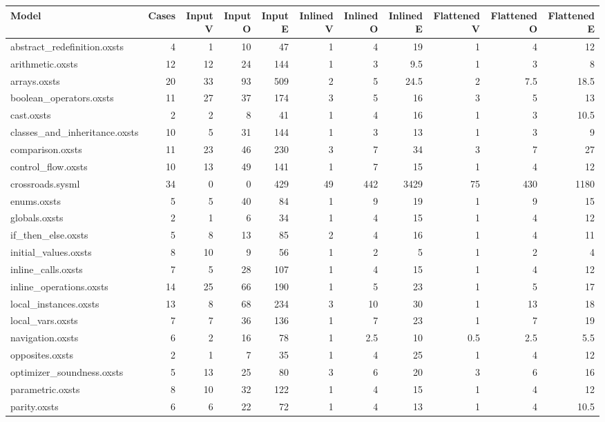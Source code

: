 \begin{tabular}{lrrrrrrrrrr}
\toprule
Model & Cases & Input V & Input O & Input E & Inlined V & Inlined O & Inlined E & Flattened V & Flattened O & Flattened E \\
\midrule
abstract\_redefinition.oxsts & 4 & 1 & 10 & 47 & 1 & 4 & 19 & 1 & 4 & 12 \\
arithmetic.oxsts & 12 & 12 & 24 & 144 & 1 & 3 & 9.5 & 1 & 3 & 8 \\
arrays.oxsts & 20 & 33 & 93 & 509 & 2 & 5 & 24.5 & 2 & 7.5 & 18.5 \\
boolean\_operators.oxsts & 11 & 27 & 37 & 174 & 3 & 5 & 16 & 3 & 5 & 13 \\
cast.oxsts & 2 & 2 & 8 & 41 & 1 & 4 & 16 & 1 & 3 & 10.5 \\
classes\_and\_inheritance.oxsts & 10 & 5 & 31 & 144 & 1 & 3 & 13 & 1 & 3 & 9 \\
comparison.oxsts & 11 & 23 & 46 & 230 & 3 & 7 & 34 & 3 & 7 & 27 \\
control\_flow.oxsts & 10 & 13 & 49 & 141 & 1 & 7 & 15 & 1 & 4 & 12 \\
crossroads.sysml & 34 & 0 & 0 & 429 & 49 & 442 & 3429 & 75 & 430 & 1180 \\
enums.oxsts & 5 & 5 & 40 & 84 & 1 & 9 & 19 & 1 & 9 & 15 \\
globals.oxsts & 2 & 1 & 6 & 34 & 1 & 4 & 15 & 1 & 4 & 12 \\
if\_then\_else.oxsts & 5 & 8 & 13 & 85 & 2 & 4 & 16 & 1 & 4 & 11 \\
initial\_values.oxsts & 8 & 10 & 9 & 56 & 1 & 2 & 5 & 1 & 2 & 4 \\
inline\_calls.oxsts & 7 & 5 & 28 & 107 & 1 & 4 & 15 & 1 & 4 & 12 \\
inline\_operations.oxsts & 14 & 25 & 66 & 190 & 1 & 5 & 23 & 1 & 5 & 17 \\
local\_instances.oxsts & 13 & 8 & 68 & 234 & 3 & 10 & 30 & 1 & 13 & 18 \\
local\_vars.oxsts & 7 & 7 & 36 & 136 & 1 & 7 & 23 & 1 & 7 & 19 \\
navigation.oxsts & 6 & 2 & 16 & 78 & 1 & 2.5 & 10 & 0.5 & 2.5 & 5.5 \\
opposites.oxsts & 2 & 1 & 7 & 35 & 1 & 4 & 25 & 1 & 4 & 12 \\
optimizer\_soundness.oxsts & 5 & 13 & 25 & 80 & 3 & 6 & 20 & 3 & 6 & 16 \\
parametric.oxsts & 8 & 10 & 32 & 122 & 1 & 4 & 15 & 1 & 4 & 12 \\
parity.oxsts & 6 & 6 & 22 & 72 & 1 & 4 & 13 & 1 & 4 & 10.5 \\

\end{tabular}
